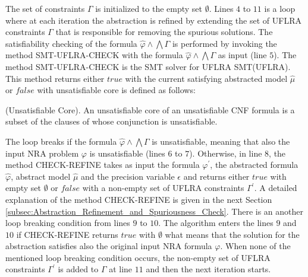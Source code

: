 \noindent The set of constraints $\Gamma$ is initialized to the empty set $\emptyset$.
Lines $4$ to $11$ is a loop where at each iteration the abstraction is refined by extending the set of UFLRA constraints $\Gamma$ that is responsible for removing the spurious solutions.
The satisfiability checking of the formula $\hat{\varphi} \wedge \bigwedge \Gamma$ is performed by invoking the method SMT-UFLRA-CHECK with the formula $\hat{\varphi} \wedge \bigwedge \Gamma$ as input (line $5$).
The method SMT-UFLRA-CHECK is the SMT solver for UFLRA SMT(UFLRA).
This method returns either $true$ with the current satisfying abstracted model $\hat{\mu}$ or $false$ with unsatisfiable core is defined as follows:\newline

\begin{definition}
    (Unsatisfiable Core).
    An unsatisfiable core of an unsatisfiable CNF formula is a subset of the clauses of whose conjunction is unsatisfiable.
 \end{definition}

\noindent The loop breaks if the formula $\hat{\varphi} \wedge \bigwedge \Gamma$ is unsatisfiable, meaning that also the input NRA problem $\varphi$ is unsatisfiable (lines $6$ to $7$).
Otherwise, in line $8$, the method CHECK-REFINE takes as input the formula $\varphi^{\prime}$, the abstracted formula $\hat{\varphi}$, abstract model $\hat{\mu}$ and the precision variable $\epsilon$ and returns either $true$ with empty set $\emptyset$ or $false$ with a non-empty set of UFLRA constraints $\Gamma^{\prime}$.
A detailed explanation of the method CHECK-REFINE is given in the next Section \ref{subsec:Abstraction_Refinement_and_Spuriousness_Check}. 
There is an another loop breaking condition from lines $9$ to $10$.
The algorithm enters the lines $9$ and $10$ if CHECK-REFINE returns $true$ with $\emptyset$ what means that the solution for the abstraction satisfies also the original input NRA formula $\varphi$.
When none of the mentioned loop breaking condition occurs, the non-empty set of UFLRA constraints $\Gamma^{\prime}$ is added to $\Gamma$ at line $11$ and then the next iteration starts.
